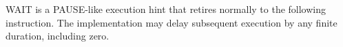 WAIT is a PAUSE-like execution hint that retires normally to the following instruction. The implementation may delay
subsequent execution by any finite duration, including zero.
